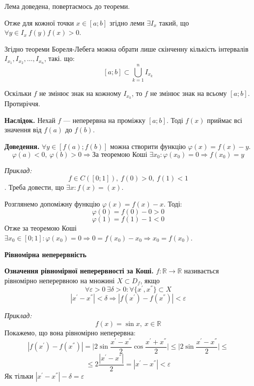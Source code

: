 \documentclass[12pt]{report}
\begin{document}
Лема доведена, повертаємось до теореми.

Отже для кожної точки $x \in [a;b]$ згідно леми $ \exists I_x$ такий, що $\forall y \in I_x\ f(y)f(x) > 0$.

Згідно теореми Бореля-Лебега можна обрати лише скінченну кількість інтервалів $I_{x_1}, I_{x_2}, \ldots, I_{x_n}$, такі. що:
$$[a;b] \subset \bigcup_{k=1}^{n} I_{x_k}$$

Оскільки $f$ не змінює знак на кожному $I_{x_k}$, то $f$ не змінює знак на всьому $[a;b]$. Протиріччя.

\vspace{3mm}

\textbf{Наслідок.} Нехай $f$ --- неперервна на проміжку $[a;b]$. Тоді $f(x)$ приймає всі значення від $f(a)$ до $f(b)$.

\textbf{Доведення.} $\forall y \in [f(a); f(b)]$ можна створити функцію $\varphi (x) = f(x) - y$. 
$$\varphi (a) < 0,\ \varphi(b) > 0 \Longrightarrow \textrm{За теоремою Коші } \exists x_0 : \varphi(x_0) = 0 \Longrightarrow f(x_0) = y$$

\vspace{3mm}

\textit{Приклад:}
$$f \in C([0;1]),\ f(0) > 0,\ f(1) < 1$$.
Треба довести, що $ \exists x : f(x) = (x)$.

Розглянемо допоміжну функцію $\varphi(x) = f(x) - x$. Тоді:
$$\varphi(0) = f(0) - 0 > 0$$
$$\varphi(1) = f(1) - 1 < 0$$
Отже за теоремою Коші $ \exists x_0 \in [0;1] : \varphi(x_0) = 0 \Longrightarrow 0 = f(x_0) - x_0 \Longrightarrow x_0 = f(x_0)$.

\begin{center}
	\textbf{Рівномірна неперервність}
\end{center}

\textbf{Означення рівномірної неперервності за Коші.} $f : \mathbb{R} \to \mathbb{R}$ називається рівномірно неперервною на множині $X \subset D_f$, якщо 
$$\forall \varepsilon > 0 \ \exists \delta > 0 : \forall \{ x^{'}, x^{''}\} \subset X$$
$$|x^{'} - x^{''}| < \delta \Longrightarrow |f(x^{'}) - f(x^{''})| < \varepsilon$$

\textit{Приклад:}
$$f(x) = \sin x,\ x \in \mathbb{R}$$
Покажемо, що вона рівномірно неперервна:
$$|f(x^{'}) - f(x^{''})| = \Big|2 \sin \frac{x^{'} - x^{''}}{2} \cos \frac{x^{'} + x^{''}}{2}\Big| \leq \Big| 2 \sin \frac{x^{'} - x^{''}}{2} \Big| \leq$$
$$\leq 2 \frac{|x^{'} - x^{''}|}{2} = |x^{'} - x^{''}| < \varepsilon$$
Як тільки $|x^{'} - x^{''}| - \delta = \varepsilon$
\end{document}
